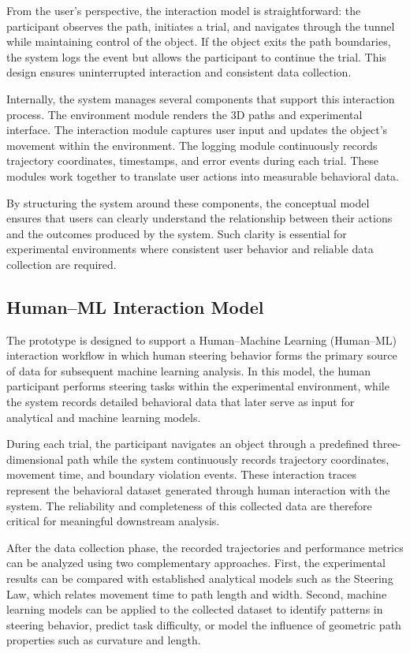 \documentclass[sigconf]{acmart}
\begin{document}
From the user's perspective, the interaction model is straightforward: the participant observes the path, initiates a trial, and navigates through the tunnel while maintaining control of the object. If the object exits the path boundaries, the system logs the event but allows the participant to continue the trial. This design ensures uninterrupted interaction and consistent data collection.

Internally, the system manages several components that support this interaction process. The environment module renders the 3D paths and experimental interface. The interaction module captures user input and updates the object's movement within the environment. The logging module continuously records trajectory coordinates, timestamps, and error events during each trial. These modules work together to translate user actions into measurable behavioral data.

By structuring the system around these components, the conceptual model ensures that users can clearly understand the relationship between their actions and the outcomes produced by the system. Such clarity is essential for experimental environments where consistent user behavior and reliable data collection are required.


\subsection{Human--ML Interaction Model}

The prototype is designed to support a Human–Machine Learning (Human--ML) interaction workflow in which human steering behavior forms the primary source of data for subsequent machine learning analysis. In this model, the human participant performs steering tasks within the experimental environment, while the system records detailed behavioral data that later serve as input for analytical and machine learning models.

During each trial, the participant navigates an object through a predefined three-dimensional path while the system continuously records trajectory coordinates, movement time, and boundary violation events. These interaction traces represent the behavioral dataset generated through human interaction with the system. The reliability and completeness of this collected data are therefore critical for meaningful downstream analysis.

After the data collection phase, the recorded trajectories and performance metrics can be analyzed using two complementary approaches. First, the experimental results can be compared with established analytical models such as the Steering Law, which relates movement time to path length and width. Second, machine learning models can be applied to the collected dataset to identify patterns in steering behavior, predict task difficulty, or model the influence of geometric path properties such as curvature and length.
\end{document}
